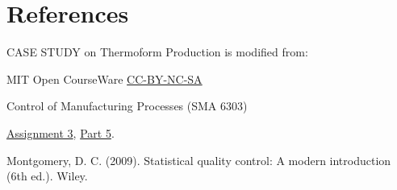 \documentclass{ximera}
\begin{document}
\section*{References}

CASE STUDY on Thermoform Production is modified from:

MIT Open CourseWare \href{https://creativecommons.org/licenses/by-nc-sa/4.0/}{CC-BY-NC-SA}

Control of Manufacturing Processes (SMA 6303)

\href{https://ocw.mit.edu/courses/2-830j-control-of-manufacturing-processes-sma-6303-spring-2008/resources/ps3/}{Assignment 3}, \href{https://ocw.mit.edu/courses/2-830j-control-of-manufacturing-processes-sma-6303-spring-2008/resources/35/}{Part 5}. 

Montgomery, D. C. (2009). Statistical quality control: A modern introduction (6th ed.). Wiley.
\end{document}
